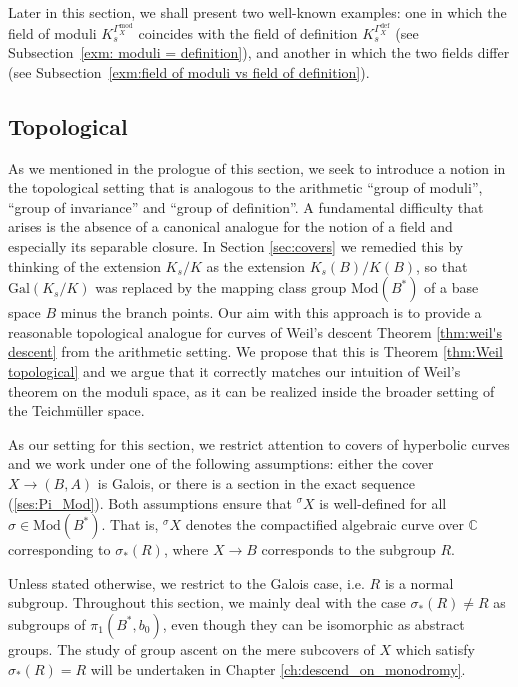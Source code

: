 \documentclass[10pt]{amsart}
\theoremstyle{definition}
\newcommand{\Gal}{{ \mathrm{Gal}}}
\begin{document}
Later in this section, we shall present two well-known examples: one in which the field of moduli $K_s^{\mathfrak{\Gamma}_X^{\mathrm{mod}}}$ coincides with the field of definition $K_s^{\mathfrak{\Gamma}_X^{\mathrm{def}}}$ (see Subsection~\ref{exm: moduli = definition}), and another in which the two fields differ (see Subsection~\ref{exm:field of moduli vs field of definition}).




\subsection{Topological}\label{sec:Top_Weil}


As we mentioned in the prologue of this section, we seek to introduce a notion in the topological setting that is analogous to the arithmetic ``group of moduli'', ``group of invariance'' and ``group of definition''. A fundamental difficulty that arises is the absence of a canonical analogue for the notion of a field and especially its separable closure. In Section \ref{sec:covers} we remedied this by thinking of the extension $K_s/K$ as the extension $K_s(B)/K(B)$, so that $\Gal(K_s/K)$ was replaced by the mapping class group $\mathrm{Mod}(B^*)$ of a base space $B$ minus the branch points. Our aim with this approach is to provide a reasonable topological analogue for curves of Weil's descent Theorem \ref{thm:weil's descent} from the arithmetic setting. We propose that this is Theorem \ref{thm:Weil topological} and we argue that it correctly matches our intuition of Weil's theorem on the moduli space, as it can be realized inside the broader setting of the Teichmüller space.


As our setting for this section, we restrict attention to covers of hyperbolic curves and we work under one of the following assumptions: either the cover $X\rightarrow (B,A)$ is Galois, or there is a section in the exact sequence (\ref{ses:Pi_Mod}). Both assumptions ensure that ${^\sigma \! X}$ is well-defined for all $\sigma \in \mathrm{Mod}(B^*)$. That is, ${^\sigma \! X}$ denotes the compactified algebraic curve over $\mathbb{C}$ corresponding to $\sigma_*(R)$, where $X\rightarrow B$ corresponds to the subgroup $R$. 

Unless stated otherwise, we restrict to the Galois case, i.e. $R$ is a normal subgroup. Throughout this section, we mainly deal with the case $\sigma_*(R) \neq R$ as subgroups of $\pi_1(B^*,b_0)$, even though they can be isomorphic as abstract groups. The study of group ascent on the mere subcovers of $X$ which satisfy $\sigma_*(R) = R$ will be undertaken in Chapter \ref{ch:descend_on_monodromy}. 
\end{document}
